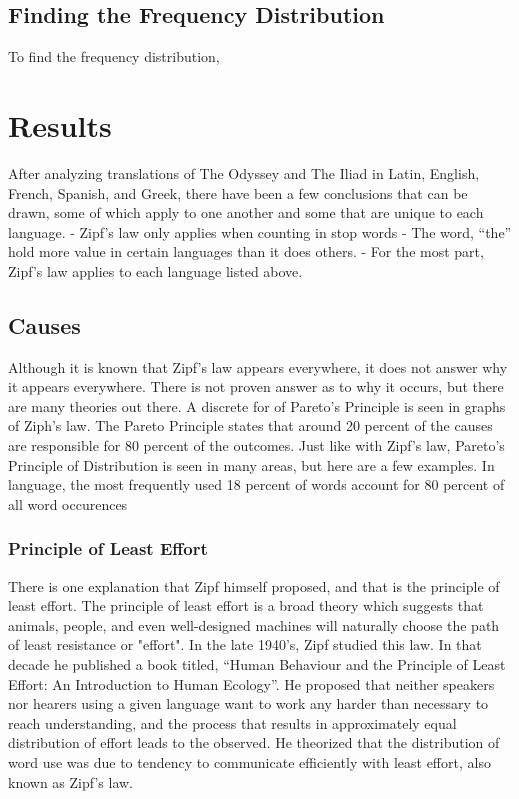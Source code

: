\documentclass[a4paper,10pt]{article}
\begin{document}
\subsection{Finding the Frequency Distribution}

To find the frequency distribution, 

\section{Results}

After analyzing translations of The Odyssey and The Iliad in Latin, English, French, Spanish, and Greek, there have been a few conclusions that can be drawn, some of which apply to one another and some that are unique to each language. 
- Zipf’s law only applies when counting in stop words
- The word, “the” hold more value in certain languages than it does others.
- For the most part, Zipf’s law applies to each language listed above.



\subsection{Causes}

Although it is known that Zipf's law appears everywhere, it does not answer why it appears everywhere. There is not proven answer as to why it occurs, but there are many theories out there. A discrete for of Pareto's Principle is seen in graphs of Ziph's law. The Pareto Principle states that around 20 percent of the causes are responsible for 80 percent of the outcomes. Just like with Zipf's law, Pareto's Principle of Distribution is seen in many areas, but here are a few examples. In language, the most frequently used 18 percent of words account for 80 percent of all word occurences

\subsubsection{Principle of Least Effort}

There is one explanation that Zipf himself proposed, and that is the principle of least effort. The principle of least effort is a broad theory which suggests that animals, people, and even well-designed machines will naturally choose the path of least resistance or "effort". In the late 1940’s, Zipf studied this law. In that decade he published a book titled, “Human Behaviour and the Principle of Least Effort: An Introduction to Human Ecology”. He proposed that neither speakers nor hearers using a given language want to work any harder than necessary to reach understanding, and the process that results in approximately equal distribution of effort leads to the observed. He theorized that the distribution of word use was due to tendency to communicate efficiently with least effort, also known as Zipf’s law. 
\end{document}
